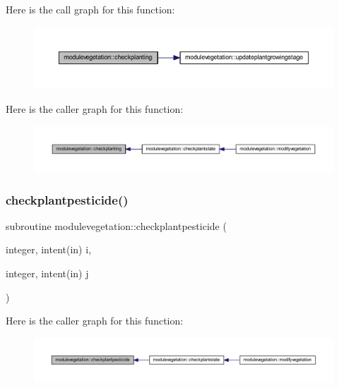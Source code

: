 Here is the call graph for this function\+:\nopagebreak
\begin{figure}[H]
\begin{center}
\leavevmode
\includegraphics[width=350pt]{namespacemodulevegetation_a51a465c0efb7efd6bb8d99cabfc0c19e_cgraph}
\end{center}
\end{figure}
Here is the caller graph for this function\+:\nopagebreak
\begin{figure}[H]
\begin{center}
\leavevmode
\includegraphics[width=350pt]{namespacemodulevegetation_a51a465c0efb7efd6bb8d99cabfc0c19e_icgraph}
\end{center}
\end{figure}
\mbox{\label{namespacemodulevegetation_aefcd4003ffaf332e5ccc9b2fabd54149}} 
\subsubsection{\texorpdfstring{checkplantpesticide()}{checkplantpesticide()}}
{\footnotesize\ttfamily subroutine modulevegetation\+::checkplantpesticide (\begin{DoxyParamCaption}\item[{integer, intent(in)}]{i,  }\item[{integer, intent(in)}]{j }\end{DoxyParamCaption})\hspace{0.3cm}{\ttfamily [private]}}

Here is the caller graph for this function\+:\nopagebreak
\begin{figure}[H]
\begin{center}
\leavevmode
\includegraphics[width=350pt]{namespacemodulevegetation_aefcd4003ffaf332e5ccc9b2fabd54149_icgraph}
\end{center}
\end{figure}
\mbox{\label{namespacemodulevegetation_a37069c3859e6dc1812ad2ddda5ab49cd}} 
